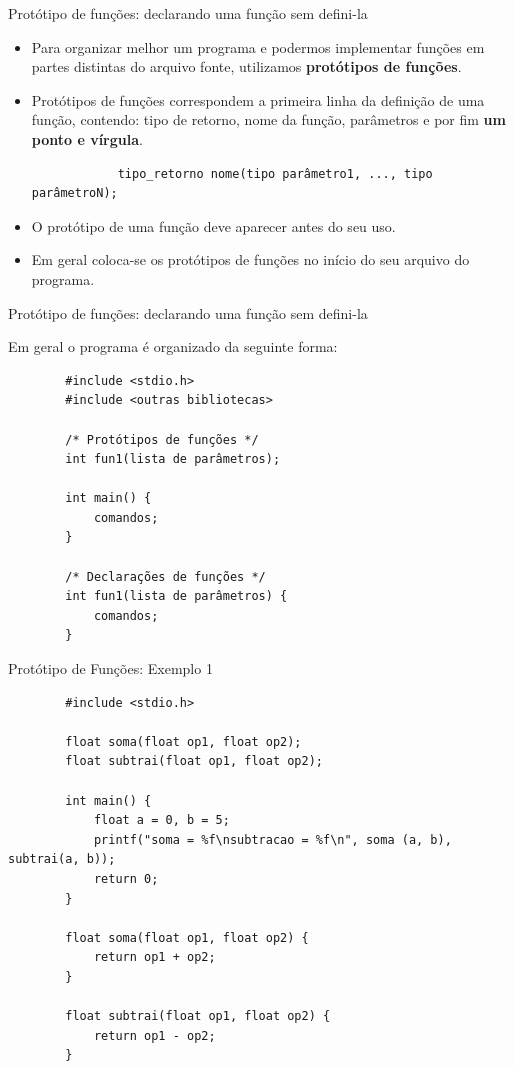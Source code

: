 \documentclass[handout]{beamer}
\begin{document}
\begin{frame}[fragile]{Protótipo de funções: declarando uma função sem defini-la}

    \begin{itemize}[<+->]
        \item Para organizar melhor um programa e podermos implementar funções em partes distintas do arquivo fonte, utilizamos {\bf protótipos de funções}.
        \item Protótipos de funções correspondem a primeira linha da definição de uma função, contendo: tipo de retorno, nome da função, parâmetros e por fim {\bf um ponto e vírgula}.

        \begin{verbatim}
            tipo_retorno nome(tipo parâmetro1, ..., tipo parâmetroN);
        \end{verbatim}

        \item O protótipo de uma função deve aparecer antes do seu uso. 
        \item Em geral coloca-se os protótipos de funções no início do seu arquivo do programa.
    \end{itemize}
\end{frame}

\begin{frame}[fragile]{Protótipo de funções: declarando uma função sem defini-la}

    Em geral o programa é organizado da seguinte forma:

    \begin{verbatim}
        #include <stdio.h>
        #include <outras bibliotecas>
        
        /* Protótipos de funções */
        int fun1(lista de parâmetros);

        int main() {
            comandos;
        }

        /* Declarações de funções */
        int fun1(lista de parâmetros) {
            comandos;
        }
    \end{verbatim}
\end{frame}

\begin{frame}[fragile]{Protótipo de Funções: Exemplo 1}

    \begin{verbatim}
        #include <stdio.h>

        float soma(float op1, float op2);
        float subtrai(float op1, float op2);

        int main() {
            float a = 0, b = 5;
            printf("soma = %f\nsubtracao = %f\n", soma (a, b), subtrai(a, b));
            return 0;
        }

        float soma(float op1, float op2) {
            return op1 + op2;
        }

        float subtrai(float op1, float op2) {
            return op1 - op2;
        }
    \end{verbatim}
\end{frame}
\end{document}
